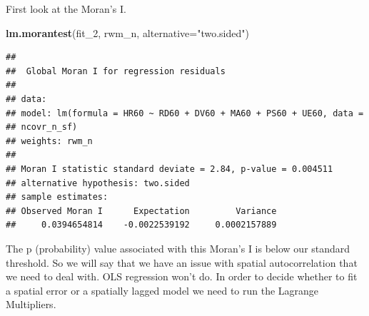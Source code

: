 \documentclass[]{book}
\newenvironment{Shaded}{\begin{snugshade}}{\end{snugshade}}
\newcommand{\CommentTok}[1]{\textcolor[rgb]{0.56,0.35,0.01}{\textit{#1}}}
\newcommand{\DataTypeTok}[1]{\textcolor[rgb]{0.13,0.29,0.53}{#1}}
\newcommand{\DecValTok}[1]{\textcolor[rgb]{0.00,0.00,0.81}{#1}}
\newcommand{\KeywordTok}[1]{\textcolor[rgb]{0.13,0.29,0.53}{\textbf{#1}}}
\newcommand{\NormalTok}[1]{#1}
\newcommand{\OperatorTok}[1]{\textcolor[rgb]{0.81,0.36,0.00}{\textbf{#1}}}
\newcommand{\StringTok}[1]{\textcolor[rgb]{0.31,0.60,0.02}{#1}}
\begin{document}
\begin{Shaded}
\end{Shaded}

First look at the Moran's I.

\begin{Shaded}
\begin{Highlighting}[]
\KeywordTok{lm.morantest}\NormalTok{(fit_}\DecValTok{2}\NormalTok{, rwm_n, }\DataTypeTok{alternative=}\StringTok{"two.sided"}\NormalTok{)}
\end{Highlighting}
\end{Shaded}

\begin{verbatim}
## 
##  Global Moran I for regression residuals
## 
## data:  
## model: lm(formula = HR60 ~ RD60 + DV60 + MA60 + PS60 + UE60, data =
## ncovr_n_sf)
## weights: rwm_n
## 
## Moran I statistic standard deviate = 2.84, p-value = 0.004511
## alternative hypothesis: two.sided
## sample estimates:
## Observed Moran I      Expectation         Variance 
##     0.0394654814    -0.0022539192     0.0002157889
\end{verbatim}

The p (probability) value associated with this Moran's I is below our standard threshold. So we will say that we have an issue with spatial autocorrelation that we need to deal with. OLS regression won't do. In order to decide whether to fit a spatial error or a spatially lagged model we need to run the Lagrange Multipliers.
\end{document}
